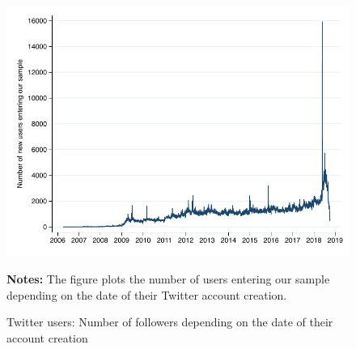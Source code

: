 \begin{figure}[ht]
\begin{center}
\includegraphics[scale=1]{figures/fig_nb_new_users_daily}
\end{center}
	\begin{spacing}{0.5}
		{\footnotesize \textbf{Notes:} The figure plots the number of users entering our sample depending on the date of their Twitter account creation.}
	\end{spacing}
\vspace{.5cm}	
	\caption{Twitter users: Number of followers depending on the date of their account creation}
	\label{fig:fig_nb_new_users_daily}
\end{figure}


